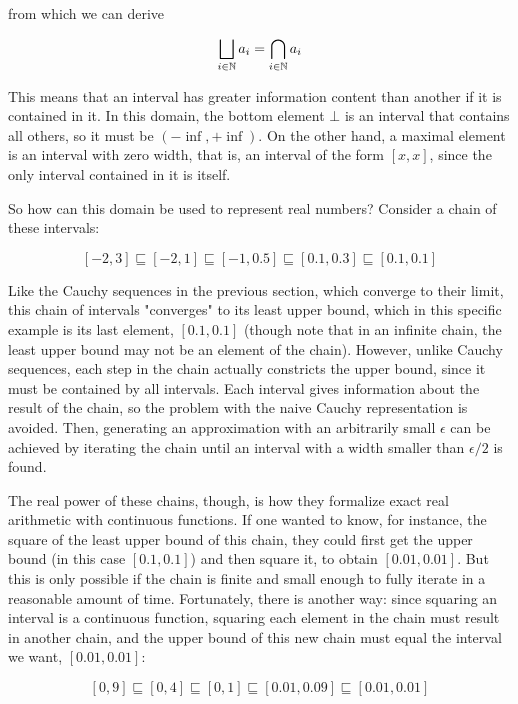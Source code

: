 from which we can derive

\begin{equation*}
\bigsqcup_{i \in \mathbb{N}} a_i = \bigcap_{i \in \mathbb{N}} a_i
\end{equation*}

This means that an interval has greater information content than another if it is contained in it. In this domain, the bottom element $\bot$ is an interval that contains all others, so it must be $(-\inf, +\inf)$. On the other hand, a maximal element is an interval with zero width, that is, an interval of the form $[x,x]$, since the only interval contained in it is itself.

So how can this domain be used to represent real numbers? Consider a chain of these intervals:

\begin{equation}
\label{eq:chain1}
  [-2,3] \sqsubseteq [-2, 1] \sqsubseteq [-1, 0.5] \sqsubseteq [0.1, 0.3] \sqsubseteq [0.1, 0.1]
\end{equation}

Like the Cauchy sequences in the previous section, which converge to their limit, this chain of intervals "converges" to its least upper bound, which in this specific example is its last element, $[0.1, 0.1]$ (though note that in an infinite chain, the least upper bound may not be an element of the chain). However, unlike Cauchy sequences, each step in the chain actually constricts the upper bound, since it must be contained by all intervals. Each interval gives information about the result of the chain, so the problem with the naive Cauchy representation is avoided. Then, generating an approximation with an arbitrarily small $\epsilon$ can be achieved by iterating the chain until an interval with a width smaller than $\epsilon / 2$ is found.

The real power of these chains, though, is how they formalize exact real arithmetic with continuous functions. If one wanted to know, for instance, the square of the least upper bound of this chain, they could first get the upper bound (in this case $[0.1, 0.1]$) and then square it, to obtain $[0.01, 0.01]$. But this is only possible if the chain is finite and small enough to fully iterate in a reasonable amount of time. Fortunately, there is another way: since squaring an interval is a continuous function, squaring each element in the chain must result in another chain, and the upper bound of this new chain must equal the interval we want, $[0.01, 0.01]$:

\begin{equation}
\label{eq:chain2}
  [0, 9] \sqsubseteq [0, 4] \sqsubseteq [0, 1] \sqsubseteq [0.01, 0.09] \sqsubseteq [0.01, 0.01]
\end{equation}

